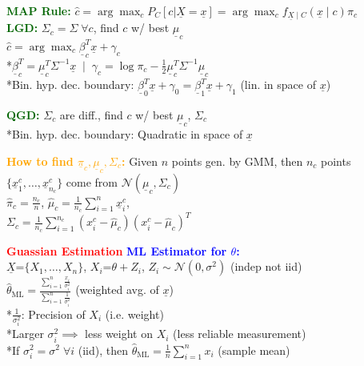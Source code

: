 \documentclass[5pt]{extarticle} %
\begin{document}
\begin{paracol}{3}
{    \textcolor{darkgreen}{\textbf{MAP Rule:}} $\hat{c} = \arg \max_c P_C[c | \underline{X} = \underline{x}] = \arg \max_c f_{\underline{X} \mid C} (\underline{x} \mid c) \pi_c$ \\

    \textcolor{darkgreen}{\textbf{LGD:}} $\Sigma_c = \Sigma \; \forall c$, find $c$ w/ best $\underline{\mu}_c$ \\
    $\hat{c} = \arg \max_c \underline{\beta}_c^T \underline{x} + \gamma_c$ \\
    *$\underline{\beta}_c^T = \underline{\mu}_c^T \Sigma^{-1} \underline{x} \; \mid \; \gamma_c = \log \pi_c - \frac{1}{2} \underline{\mu}_c^T \Sigma^{-1} \underline{\mu}_c$ \\
    *Bin. hyp. dec. boundary: $\underline{\beta}_0^T \underline{x} + \gamma_0 = \underline{\beta}_1^T \underline{x} + \gamma_1$ (lin. in space of $\underline{x}$) 

    \textcolor{darkgreen}{\textbf{QGD:}} $\Sigma_c$ are diff., find $c$ w/ best $\underline{\mu}_c$, $\Sigma_c$ \\
    *Bin. hyp. dec. boundary: Quadratic in space of $\underline{x}$

    \textcolor{orange}{\textbf{How to find $\underline{\pi}_c, \underline{\mu}_c, \Sigma_c$:}} Given $n$ points gen. by GMM, then $n_c$ points $\{\underline{x}_1^c, \ldots, \underline{x}_{n_c}^c\}$ come from $\mathcal{N} (\underline{\mu}_c, \Sigma_c)$ \\
    $\hat{\pi}_c = \frac{n_c}{n}$, $\hat{\mu}_c = \frac{1}{n_c} \sum_{i=1}^{n} \underline{x}_i^c$, \\
    $\Sigma_c = \frac{1}{n_c} \sum_{i=1}^{n_c} (x_i^c - \hat{\mu}_c)(x_i^c - \hat{\mu}_c)^T$

    \textcolor{red}{\textbf{Guassian Estimation}} \textcolor{blue}{\textbf{ML Estimator for $\theta$:}} \\ 
    $\underline{X} \text{=} \{X_1,\ldots,X_n\}$, $X_i \text{=} \theta + Z_i$, $Z_i \sim \mathcal{N}(0, \sigma^2)$ (indep not iid) \\
    $\hat{\theta}_{\text{ML}} = \frac{\sum_{i=1}^n \frac{x_i}{\sigma_i^2}}{\sum_{i=1}^n \frac{1}{\sigma_i^2}}$ (weighted avg. of $\underline{x}$) \\
    *$\frac{1}{\sigma_i^2}$: Precision of $X_i$ (i.e. weight) \\
    *Larger $\sigma_i^2 \implies$ less weight on $X_i$ (less reliable measurement) \\
    *If $\sigma_i^2 = \sigma^2 \; \forall i$ (iid), then $\hat{\theta}_{\text{ML}} = \frac{1}{n} \sum_{i=1}^n x_i$ (sample mean) 

}
\end{paracol}
\end{document}
